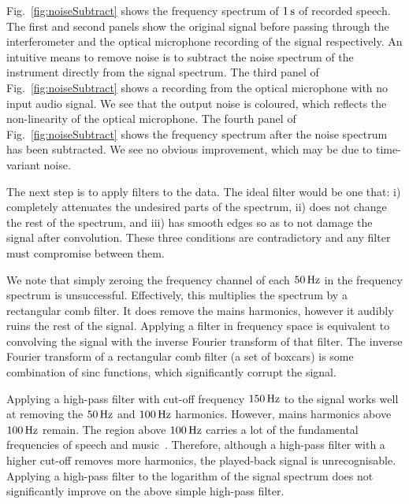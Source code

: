 \documentclass[paper-main.tex]{subfiles}
\begin{document}
Fig.~\ref{fig:noiseSubtract} shows the frequency spectrum of $1\,{\rm s}$ of recorded speech. 
The first and second panels show the original signal before passing through the interferometer and the optical microphone recording of the signal respectively. 
An intuitive means to remove noise is to subtract the noise spectrum of the instrument directly from the signal spectrum. 
The third panel of Fig.~\ref{fig:noiseSubtract} shows a recording from the optical microphone with no input audio signal. 
We see that the output noise is coloured, which reflects the non-linearity of the optical microphone.
The fourth panel of Fig.~\ref{fig:noiseSubtract} shows the frequency spectrum after the noise spectrum has been subtracted. 
We see no obvious improvement, which may be due to time-variant noise. 


The next step is to apply filters to the data. 
The ideal filter would be one that:
i) completely attenuates the undesired parts of the spectrum, 
ii) does not change the rest of the spectrum, and 
iii) has smooth edges so as to not damage the signal after convolution. 
These three conditions are contradictory and any filter must compromise between them. 

We note that simply zeroing the frequency channel of each $50\,{\rm Hz}$ in the frequency spectrum is unsuccessful. 
Effectively, this multiplies the spectrum by a rectangular comb filter. 
It does remove the mains harmonics, however it audibly ruins the rest of the signal. 
Applying a filter in frequency space is equivalent to convolving the signal with the inverse Fourier transform of that filter. 
The inverse Fourier transform of a rectangular comb filter (a set of boxcars) is some combination of sinc functions, which significantly corrupt the signal. 


Applying a high-pass filter with cut-off frequency $150\,{\rm Hz}$ to the signal works well at removing the $50\,{\rm Hz}$ and $100\,{\rm Hz}$ harmonics.
However, mains harmonics above $100\,{\rm Hz}$ remain. 
The region above $100\,{\rm Hz}$ carries a lot of the fundamental frequencies of speech and music~\cite{speech_intelligibility}. 
Therefore, although a high-pass filter with a higher cut-off removes more harmonics, the played-back signal is unrecognisable. 
Applying a high-pass filter to the logarithm of the signal spectrum does not significantly improve on the above simple high-pass filter.
\end{document}
